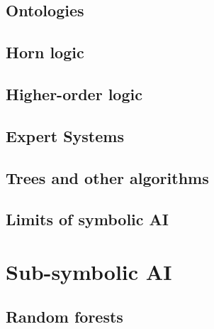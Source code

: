 \subsection{}\label{subsec:cl}

\subsection{}\label{subsec:dl}

\subsection{Ontologies}\label{subsec:ontologies}

\subsection{Horn logic}\label{subsec:horn-logic}

\subsection{Higher-order logic}\label{subsec:higher-order-logic}

\subsection{Expert Systems}\label{subsec:expert-systems}

\subsection{Trees and other algorithms}\label{subsec:trees-and-other-algorithms}

\subsection{Limits of symbolic \Gls{AI}}\label{subsec:limits-of-symbolic-ai}

\section{Sub-symbolic \Gls{AI}}\label{sec:sub-symbolic-ai}

\subsection{Random forests}\label{subsec:random-forests}

